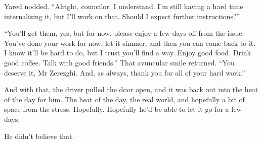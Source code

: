 Yared nodded. ``Alright, councilor. I understand. I'm still having a hard time internalizing it, but I'll work on that. Should I expect further instructions?''

``You'll get them, yes, but for now, please enjoy a few days off from the issue. You've done your work for now, let it simmer, and then you can come back to it. I know it'll be hard to do, but I trust you'll find a way. Enjoy good food. Drink good coffee. Talk with good friends.'' That avuncular smile returned. ``You deserve it, Mr Zerezghi. And, as always, thank you for all of your hard work.''

And with that, the driver pulled the door open, and it was back out into the heat of the day for him. The heat of the day, the real world, and hopefully a bit of space from the stress. Hopefully. Hopefully he'd be able to let it go for a few days.

He didn't believe that.
